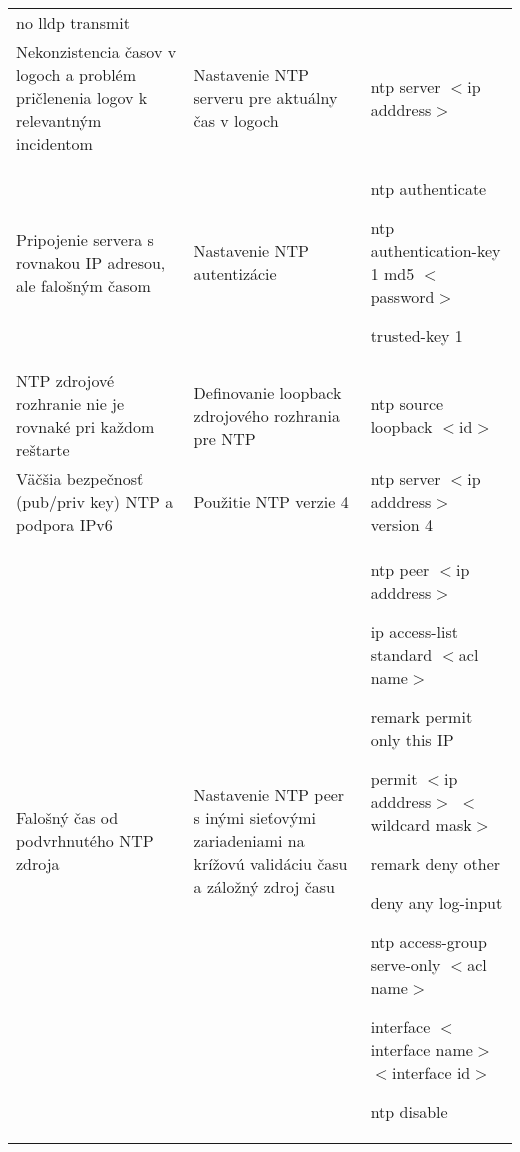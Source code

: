 \begin{longtable}[!htbp]{|L{10em}L{10em}>{\selectfont}L{34em}|}
	\hspace{0.5em}no lldp transmit\\
	
	
	
	
	Nekonzistencia časov v logoch a problém pričlenenia logov k relevantným incidentom	&Nastavenie NTP serveru pre aktuálny čas v logoch	&ntp server $<$ip adddress$>$\\
	
	
	
	
	 Pripojenie servera s rovnakou IP adresou, ale falošným časom	&Nastavenie NTP autentizácie	&ntp authenticate
	
	ntp authentication-key 1 md5 $<$password$>$
	
	trusted-key 1\\
	
	
	
	
	NTP zdrojové rozhranie nie je rovnaké pri každom reštarte	& Definovanie loopback zdrojového rozhrania pre NTP	&ntp source loopback $<$id$>$\\
	
	
	
	
	Väčšia bezpečnosť (pub/priv key) NTP a podpora IPv6	&Použitie NTP verzie 4	&ntp server $<$ip adddress$>$ version 4\\
	
	
	
	Falošný čas od podvrhnutého NTP zdroja	&Nastavenie NTP peer s inými sieťovými zariadeniami na krížovú validáciu času a záložný zdroj času	&ntp peer $<$ip adddress$>$
	
	ip access-list standard $<$acl name$>$
	
	\hspace{0.5em}remark permit only this IP 
	
	\hspace{0.5em}permit $<$ip adddress$>$ $<$wildcard mask$>$
	
	\hspace{0.5em}remark deny other 
	
	\hspace{0.5em}deny any log-input
	
	ntp access-group serve-only $<$acl name$>$
	
	interface $<$interface name$>$ $<$interface id$>$
	
	\hspace{0.5em}ntp disable\\
	
	
	

\end{longtable}
